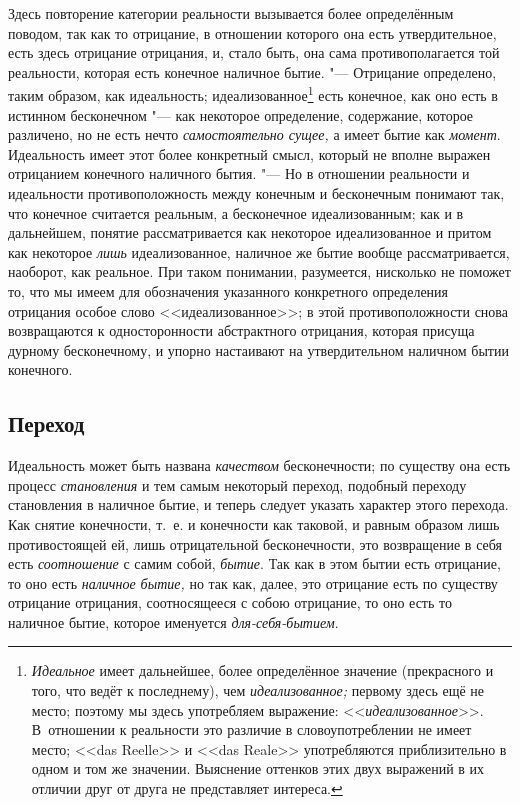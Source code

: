 Здесь повторение категории реальности вызывается более определённым поводом,
так как то отрицание, в отношении которого она есть утвердительное, есть
здесь отрицание отрицания, и, стало быть, она сама противополагается той
реальности, которая есть конечное наличное бытие. "--- Отрицание определено,
таким образом, как идеальность; идеализованное\footnote{{\em Идеальное}
имеет дальнейшее, более определённое значение (прекрасного и
того, что ведёт к последнему), чем {\em идеализованное;} первому здесь ещё
не место; поэтому мы здесь употребляем выражение: <<{\em идеализованное}>>.
В~отношении к реальности это различие в словоупотреблении не имеет место;
<<das Reelle>> и <<das Reale>> употребляются приблизительно в одном и том же
значении. Выяснение оттенков этих двух выражений в их отличии друг от друга
не представляет интереса.} есть конечное, как оно есть в истинном
бесконечном "--- как некоторое определение, содержание, которое различено, но
не есть нечто {\em самостоятельно сущее,} а имеет бытие
как {\em момент}. Идеальность имеет этот более
конкретный смысл, который не вполне выражен отрицанием конечного наличного
бытия. "--- Но в отношении реальности и идеальности противоположность между
конечным и бесконечным понимают так, что конечное считается реальным, а
бесконечное идеализованным; как и в дальнейшем, понятие рассматривается как
некоторое идеализованное и притом как некоторое
{\em лишь} идеализованное, наличное же бытие вообще
рассматривается, наоборот, как реальное. При таком понимании, разумеется,
нисколько не поможет то, что мы имеем для обозначения указанного
конкретного определения отрицания особое слово <<идеализованное>>; в этой
противоположности снова возвращаются к односторонности абстрактного
отрицания, которая присуща дурному бесконечному, и упорно настаивают на
утвердительном наличном бытии конечного.

\subsection[Переход]{Переход}

Идеальность может быть названа {\em качеством}
бесконечности; по существу она есть процесс
{\em становления} и тем самым некоторый переход,
подобный переходу становления в наличное бытие, и теперь следует указать
характер этого перехода. Как снятие конечности, т.~е. и конечности как
таковой, и равным образом лишь противостоящей ей, лишь отрицательной
бесконечности, это возвращение в себя есть {\em соотношение} с самим собой,
{\em бытие}. Так как в этом бытии есть отрицание, то
оно есть {\em наличное бытие,} но так как, далее, это отрицание есть
по существу отрицание отрицания, соотносящееся с собою отрицание, то
оно есть то наличное бытие, которое именуется {\em для-себя-бытием}.

